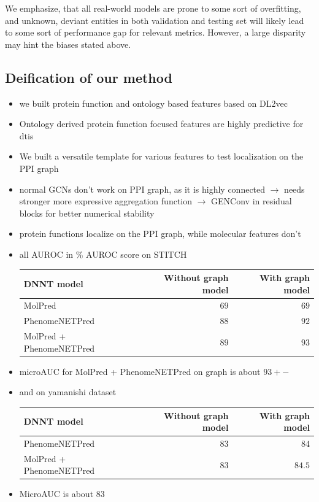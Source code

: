 \documentclass{bioinfo}
\begin{document}
We emphasize, that all real-world models are prone to some sort of
overfitting, and unknown, deviant entities in both validation and
testing set will likely lead to some sort of performance gap for
relevant metrics. However, a large disparity may hint the biases
stated above.





\subsection{Deification of our method}
\begin{itemize}
	\item we built protein function and ontology based features based on DL2vec
	\item Ontology derived protein function focused features are highly predictive for dtis
	\item We built a versatile template for various features to test localization on the PPI graph
	\item normal GCNs don't work on PPI graph, as it is highly connected $\rightarrow$ needs stronger more expressive aggregation function $\rightarrow$ GENConv in residual blocks for better numerical stability
	\item protein functions localize on the PPI graph, while molecular features don't
	\item all AUROC in \% AUROC score on STITCH
	
	\begin{tabular}{|l|r|r|}
		\hline
		DNNT model&Without graph model&With graph model\\
		\hline
		MolPred&$69$&$69$\\
		PhenomeNETPred&$88$&$92$\\
		\hline
		MolPred + PhenomeNETPred & $89$ & $93$\\
		\hline
	\end{tabular}
	\item microAUC for MolPred + PhenomeNETPred on graph is about $93+-$
	\item and on yamanishi dataset
	
	\begin{tabular}{|l|r|r|}
		\hline
		DNNT model&Without graph model&With graph model\\
		\hline
		PhenomeNETPred&$83$&$84$\\
		\hline
		MolPred + PhenomeNETPred & $83$ & $84.5$\\
		\hline
	\end{tabular}
	\item MicroAUC is about $83$
\end{itemize}
\end{document}
